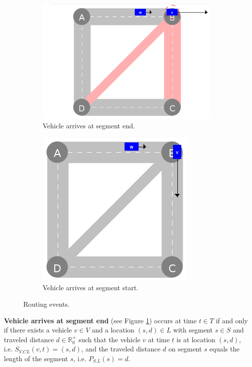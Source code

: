 \documentclass[graybox]{svmult}
\begin{document}
\begin{figure}
	\centering
	\begin{subfigure}{.45\textwidth}
		\centering
		\includegraphics[scale=0.35]{../../events/vehicle-at-intersection-before.png}
		\caption{Vehicle arrives at segment end.}
		\label{fig:vehicle-at-intersection-before}
	\end{subfigure}
	\begin{subfigure}{.45\textwidth}
		\centering
		\includegraphics[scale=0.35]{../../events/vehicle-at-intersection-after.png}
		\caption{Vehicle arrives at segment start.}
		\label{fig:vehicle-at-intersection-after}
	\end{subfigure}
	\caption{Routing events.}
		\label{fig:routing-events}
\end{figure}

\noindent
\textbf{Vehicle arrives at segment end} (see Figure \ref{fig:vehicle-at-intersection-before})
occurs at time $t \in T$ if and only if there exists a vehicle $v \in V$ and a location $(s,d) \in L$ with segment $s \in S$ and traveled distance $d \in \mathbb{R}_0^+$ such that the vehicle $v$ at time $t$ is at location $(s,d)$, i.e. $S_{V.CL}(v,t) = (s,d)$, and the traveled distance $d$ on segment $s$ equals the length of the segment $s$, i.e. $P_{S.L}(s) = d$.
\end{document}
